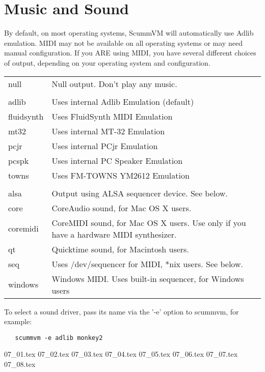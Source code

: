 

\section{Music and Sound} \label{sect-music-and-sound}
By default, on most operating systems, ScummVM will automatically use Adlib
emulation. MIDI may not be available on all operating systems or may need
manual configuration. If you ARE using MIDI, you have several different
choices of output, depending on your operating system and configuration.

\begin{tabular}[h]{ll}
  null       & Null output. Don't play any music.\\
             & \\
  adlib      & Uses internal Adlib Emulation (default)\\
  fluidsynth & Uses FluidSynth MIDI Emulation\\
  mt32       & Uses internal MT-32 Emulation\\
  pcjr       & Uses internal PCjr Emulation \\
  pcspk      & Uses internal PC Speaker Emulation\\
  towns      & Uses FM-TOWNS YM2612 Emulation\\
             & \\
  alsa       & Output using ALSA sequencer device. See below.\\
  core       & CoreAudio sound, for Mac OS X users.\\
  coremidi   & CoreMIDI sound, for Mac OS X users. Use only if you have a hardware MIDI synthesizer.\\
  qt         & Quicktime sound, for Macintosh users.\\
  seq        & Uses /dev/sequencer for MIDI, *nix users. See below.\\
  windows    & Windows MIDI. Uses built-in sequencer, for Windows users\\
\end{tabular}

To select a sound driver, pass its name via the '-e' option to scummvm,
for example:
\begin{verbatim}
   scummvm -e adlib monkey2
\end{verbatim}

 {07_01.tex}
 {07_02.tex}
 {07_03.tex}
 {07_04.tex}
 {07_05.tex}
 {07_06.tex}
 {07_07.tex}
 {07_08.tex}
